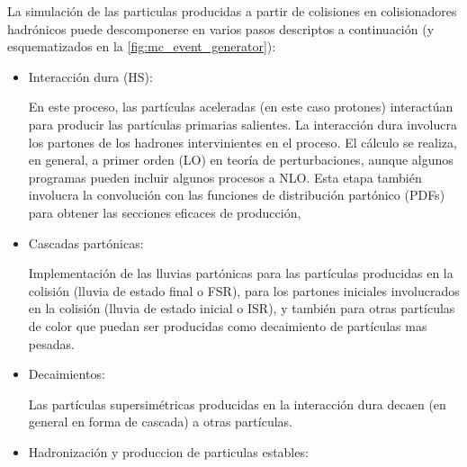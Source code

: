 La simulación de las particulas producidas a partir de colisiones en
colisionadores hadrónicos puede descomponerse en varios pasos descriptos a
continuación (y esquematizados en la \cref{fig:mc_event_generator}):

\begin{itemize}

\item Interacción dura (HS):

  En este proceso, las partículas aceleradas (en este caso protones) interactúan
  para producir las partículas primarias salientes. La interacción dura
  involucra los partones de los hadrones intervinientes en el proceso. El
  cálculo se realiza, en general, a primer orden (LO) en teoría de
  perturbaciones, aunque algunos programas pueden incluir algunos procesos a
  NLO. Esta etapa también involucra la convolución con las funciones de
  distribución partónico (PDFs) para obtener las secciones eficaces de producción,

\item Cascadas partónicas:

  Implementación de las lluvias partónicas para las partículas producidas en la
  colisión (lluvia de estado final o FSR), para los partones iniciales
  involucrados en la colisión (lluvia de estado inicial o ISR), y también para
  otras partículas de color que puedan ser producidas como decaimiento de
  partículas mas pesadas.


\item Decaimientos:

  Las partículas supersimétricas producidas en la interacción dura decaen (en
  general en forma de cascada) a otras partículas.


\item Hadronización y produccion de particulas estables:


\end{itemize}

